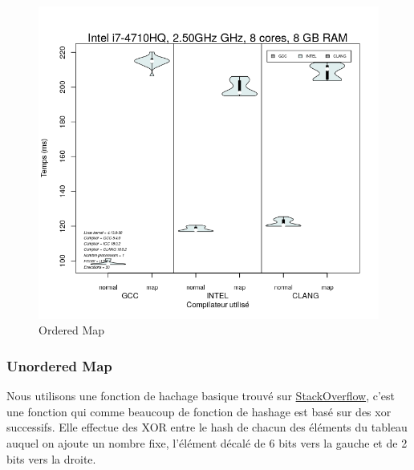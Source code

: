 \documentclass[
 aip,
 jmp,
 amsmath,amssymb,
 reprint
]{revtex4-1}
\begin{document}
\begin{figure}[H]
  \includegraphics[width=\linewidth, keepaspectratio=true]{sorted_map.png}
  \caption{Ordered Map\label{Fig:ordered_map}}
\end{figure}

\subsubsection{Unordered Map}
Nous utilisons une fonction de hachage basique trouvé sur \href{https://stackoverflow.com/a/42701911}{StackOverflow}, c'est une fonction qui comme beaucoup de fonction de hashage est basé sur des xor successifs. Elle effectue des XOR entre le hash de chacun des éléments du tableau auquel on ajoute un nombre fixe, l'élément décalé de 6 bits vers la gauche et de 2 bits vers la droite.
\end{document}
